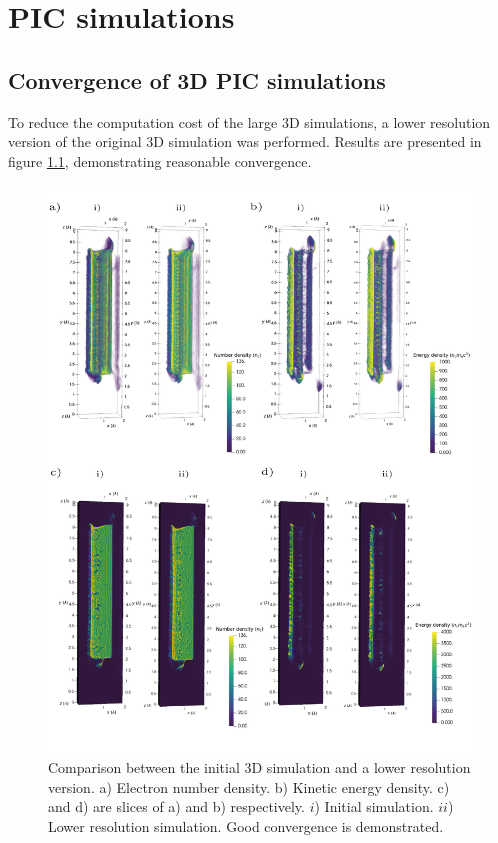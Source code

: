 \chapter{\label{app:1-sims}PIC simulations}

\minitoc

\section{Convergence of 3D PIC simulations}\label{sec:app-pic_convergence3D}
To reduce the computation cost of the large 3D simulations, a lower resolution version of the original 3D simulation was performed. Results are presented in figure \ref{fig:zvp3dcomparelowres}, demonstrating reasonable convergence.
\begin{figure}
	\centering
	\includegraphics[width=1\linewidth]{figures/zvp/zvp_3D_compare_lowres}
	\caption[Comparison between the initial 3D simulation and a lower resolution version.]{Comparison between the initial 3D simulation and a lower resolution version. a) Electron number density. b) Kinetic energy density. c) and d) are slices of a) and b) respectively. $i$) Initial simulation. $ii$) Lower resolution simulation. Good convergence is demonstrated.}
	\label{fig:zvp3dcomparelowres}
\end{figure}
